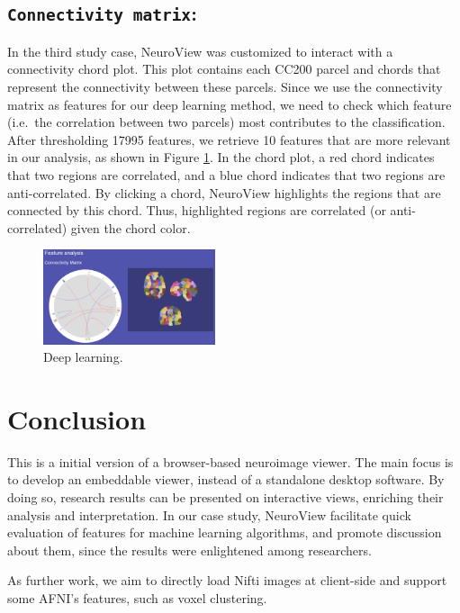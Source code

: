 \documentclass[twocolumn]{bmcart}%
\begin{document}
\subsection{\texorpdfstring{\texttt{Connectivity matrix}:}{:}}\label{section-2}

In the third study case, NeuroView was customized to interact with a
connectivity chord plot. This plot contains each CC200 parcel and chords
that represent the connectivity between these parcels. Since we use the
connectivity matrix as features for our deep learning method, we need to
check which feature (i.e.~the correlation between two parcels) most
contributes to the classification. After thresholding 17995 features, we
retrieve 10 features that are more relevant in our analysis, as shown in
Figure \ref{fig:deeplearning}. In the chord plot, a red chord indicates
that two regions are correlated, and a blue chord indicates that two
regions are anti-correlated. By clicking a chord, NeuroView highlights
the regions that are connected by this chord. Thus, highlighted regions
are correlated (or anti-correlated) given the chord color.

\begin{figure}[ht]
\centering
\includegraphics[width=0.45\textwidth]{figs/deeplearning.png}
\caption{Deep learning.}
\label{fig:deeplearning}
\end{figure}

\section{Conclusion}\label{conclusion}

This is a initial version of a browser-based neuroimage viewer. The main
focus is to develop an embeddable viewer, instead of a standalone
desktop software. By doing so, research results can be presented on
interactive views, enriching their analysis and interpretation. In our
case study, NeuroView facilitate quick evaluation of features for
machine learning algorithms, and promote discussion about them, since
the results were enlightened among researchers.

As further work, we aim to directly load Nifti images at client-side and
support some AFNI's features, such as voxel clustering.
\end{document}
